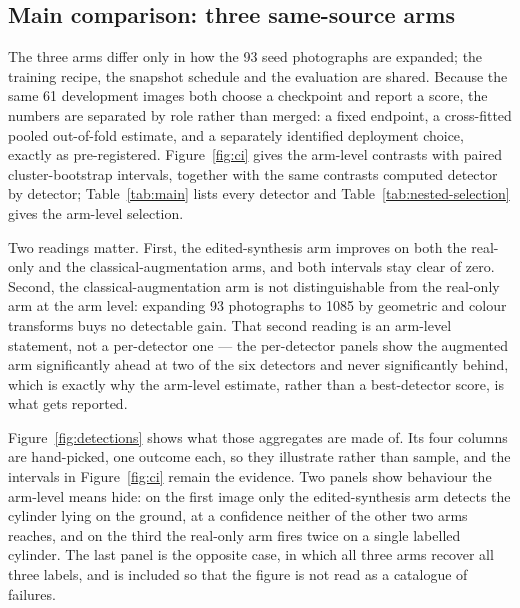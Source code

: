 \documentclass[preprint,12pt]{elsarticle}
\begin{document}
\subsection{Main comparison: three same-source arms}\label{sec:main}




The three arms differ only in how the 93 seed photographs are expanded; the training recipe,
the snapshot schedule and the evaluation are shared. Because the same 61 development images
both choose a checkpoint and report a score, the numbers are separated by role rather than
merged: a fixed endpoint, a cross-fitted pooled out-of-fold estimate, and a separately
identified deployment choice, exactly as pre-registered. Figure~\ref{fig:ci} gives the
arm-level contrasts with paired cluster-bootstrap intervals, together with the same contrasts
computed detector by detector; Table~\ref{tab:main} lists every detector and
Table~\ref{tab:nested-selection} gives the arm-level selection.

Two readings matter. First, the edited-synthesis arm improves on both the real-only and the
classical-augmentation arms, and both intervals stay clear of zero. Second, the
classical-augmentation arm is not distinguishable from the real-only arm at the arm level:
expanding 93 photographs to 1085 by geometric and colour transforms buys no detectable gain.
That second reading is an arm-level statement, not a per-detector one --- the per-detector
panels show the augmented arm significantly ahead at two of the six detectors and never
significantly behind, which is exactly why the arm-level estimate, rather than a
best-detector score, is what gets reported.

Figure~\ref{fig:detections} shows what those aggregates are made of. Its four columns are
hand-picked, one outcome each, so they illustrate rather than sample, and the intervals in
Figure~\ref{fig:ci} remain the evidence. Two panels show behaviour the arm-level means hide:
on the first image only the edited-synthesis arm detects the cylinder lying on the ground, at
a confidence neither of the other two arms reaches, and on the third the real-only arm fires
twice on a single labelled cylinder. The last panel is the opposite case, in which all three
arms recover all three labels, and is included so that the figure is not read as a catalogue
of failures.
\end{document}

